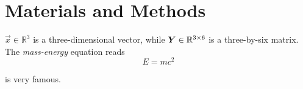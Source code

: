 

\section{Materials and Methods \label{sec:materials-and-methods}}
    \(\vec{x}\in\mathbb{R}^3\) is a three-dimensional vector, while \(\mat{Y}\in\mathbb{R}^{3\times 6}\) is a three-by-six matrix. 
    The \emph{mass-energy} equation reads
    \begin{equation}
        \label{eq:mass-energy-equivalence}
	    E = m c^2
    \end{equation}

     is very famous.